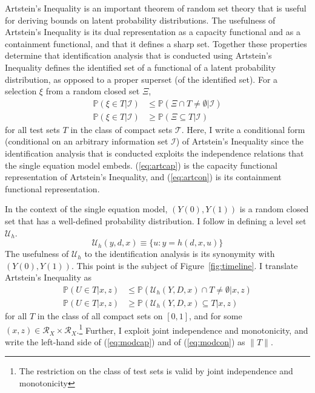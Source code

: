 \documentclass[12pt,a4paper,twoside]{article}
\numberwithin{equation}{section}
\newcommand{\Art}{Artstein's Inequality}
\begin{document}
{\Art} \citep{aR83} is an important theorem of random set theory that is useful for deriving bounds on latent probability distributions. The usefulness of {\Art} is its dual representation as a capacity functional and as a containment functional, and that it defines a sharp set. Together these properties determine that identification analysis that is conducted using {\Art} defines the identified set of a functional of a latent probability distribution, as opposed to a proper superset (of the identified set). For a selection $\xi$ from a random closed set $\Xi$,
\begin{align}
\mathbb{P}(\xi\in T|\mathcal{I})&\leq\mathbb{P}(\Xi\cap T\neq\emptyset|\mathcal{I})\label{eq:artcap}\\
\mathbb{P}(\xi\in T|\mathcal{I})&\geq\mathbb{P}(\Xi\subseteq T|\mathcal{I})\label{eq:artcon}
\end{align}
for all test sets $T$ in the class of compact sets $\mathcal{T}$. Here, I write a conditional form (conditional on an arbitrary information set $\mathcal{I}$) of {\Art} since the identification analysis that is conducted exploits the independence relations that the single equation model embeds. (\ref{eq:artcap}) is the capacity functional representation of {\Art}, and (\ref{eq:artcon}) is its containment functional representation. 

In the context of the single equation model, $(Y(0),Y(1))$ is a random closed set that has a well-defined probability distribution. I follow \cite{cr13} in defining a level set $\mathcal{U}_h$.
\[\mathcal{U}_h(y,d,x)\equiv\lbrace u : y=h(d,x,u)\rbrace\] 
The usefulness of $\mathcal{U}_h$ to the identification analysis is its synonymity with $(Y(0),Y(1))$. This point is the subject of Figure~\ref{fig:timeline}. I translate {\Art} as 
\begin{align}
\mathbb{P}(U\in T|x,z)&\leq\mathbb{P}(\mathcal{U}_h(Y,D,x)\cap T\neq\emptyset|x,z)\label{eq:modcap}\\
\mathbb{P}(U\in T|x,z)&\geq\mathbb{P}(\mathcal{U}_h(Y,D,x)\subseteq T|x,z)\label{eq:modcon}
\end{align}
for all $T$ in the class of all compact sets on $[0,1]$, and for some $(x,z)\in\mathcal{R}_X\times\mathcal{R}_X$.\footnote{The restriction on the class of test sets is valid by joint independence and monotonicity} Further, I exploit joint independence and monotonicity, and write the left-hand side of (\ref{eq:modcap}) and of (\ref{eq:modcon}) as $\| T\|$. 
\end{document}
